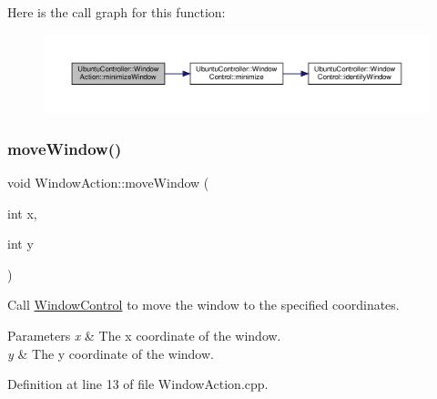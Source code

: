 Here is the call graph for this function\+:
\nopagebreak
\begin{figure}[H]
\begin{center}
\leavevmode
\includegraphics[width=350pt]{class_ubuntu_controller_1_1_window_action_aa6f2b2543505c0c44027b501f151d4bf_cgraph}
\end{center}
\end{figure}
\mbox{\label{class_ubuntu_controller_1_1_window_action_ae79c374bbbc84ff3dfb8565ede5f4220}} 
\subsubsection{\texorpdfstring{move\+Window()}{moveWindow()}}
{\footnotesize\ttfamily void Window\+Action\+::move\+Window (\begin{DoxyParamCaption}\item[{int}]{x,  }\item[{int}]{y }\end{DoxyParamCaption})}

Call \hyperlink{class_ubuntu_controller_1_1_window_control}{Window\+Control} to move the window to the specified coordinates.


\begin{DoxyParams}{Parameters}
{\em x} & The x coordinate of the window. \\
\hline
{\em y} & The y coordinate of the window. \\
\hline
\end{DoxyParams}


Definition at line 13 of file Window\+Action.\+cpp.

